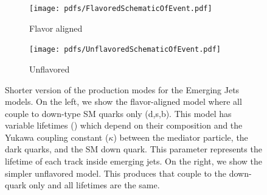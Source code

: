 \begin{figure}
	\centering
	\begin{subfigure}{.45\linewidth}
		\texttt{[image: pdfs/FlavoredSchematicOfEvent.pdf]}
		\caption{Flavor aligned}
		\label{fig:emj_prod2A}
	\end{subfigure}
	\begin{subfigure}{.45\linewidth}
		\texttt{[image: pdfs/UnflavoredSchematicOfEvent.pdf]}
		\caption{Unflavored}
	\end{subfigure}
	\caption[Shorter version of the production modes for the Emerging Jets models.]{Shorter version of the production modes for the Emerging Jets models. On the left, we show the flavor-aligned model where all \Qdark couple to down-type SM quarks only (d,s,b).
		This model has \pidark variable lifetimes (\ctaudpi ) which depend on their composition and the Yukawa coupling constant ($\kappa$) between the mediator particle, the dark quarks, and the SM down quark. This parameter represents the lifetime of each track inside emerging jets.
		On the right, we show the simpler unflavored model. This produces \Qdark that couple to the down-quark only and all \pidark lifetimes are the same.}
	\label{fig:emj_production2}
\end{figure}


